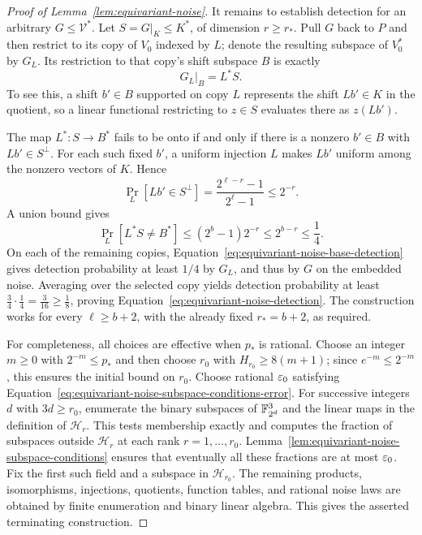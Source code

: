 \begin{proof}[Proof of Lemma~\ref{lem:equivariant-noise}]
It remains to establish detection for an arbitrary
$G\le\mathcal V^*$.  Let $S=G|_K\le K^*$, of dimension $r\ge r_*$.
Pull $G$ back to $P$ and then restrict to its copy of $V_0$ indexed by
$L$; denote the resulting subspace of $V_0^*$ by $G_L$.
Its restriction to that copy's shift subspace $B$ is exactly
\[
 G_L|_B=L^*S.
\]
To see this, a shift $b'\in B$ supported on copy $L$ represents the
shift $Lb'\in K$ in the quotient, so a linear functional restricting to
$z\in S$ evaluates there as $z(Lb')$.

The map $L^*:S\to B^*$ fails to be onto if and only if there is a
nonzero $b'\in B$ with $Lb'\in S^\perp$.  For each such fixed $b'$, a
uniform injection $L$ makes $Lb'$ uniform among the nonzero vectors of
$K$.  Hence
\[
 \Pr_L[Lb'\in S^\perp]
 =\frac{2^{\ell-r}-1}{2^\ell-1}
 \le2^{-r}.
\]
A union bound gives
\[
 \Pr_L[L^*S\ne B^*]
 \le(2^b-1)2^{-r}
 \le2^{b-r}\le\frac14.
\]
On each of the remaining copies,
Equation~\eqref{eq:equivariant-noise-base-detection} gives detection probability at
least $1/4$ by $G_L$, and thus by $G$ on the embedded noise.
Averaging over the selected copy yields detection probability at least
$\frac34\cdot\frac14=\frac{3}{16}\ge\frac18$, proving
Equation~\eqref{eq:equivariant-noise-detection}.
The construction works for every $\ell\ge b+2$, with the already fixed
$r_*=b+2$, as required.

For completeness, all choices are effective when $p_*$ is rational.
Choose an integer $m\ge0$ with $2^{-m}\le p_*$ and then choose $r_0$ with
$H_{r_0}\ge8(m+1)$; since $e^{-m}\le2^{-m}$, this ensures the initial
bound on $r_0$.  Choose rational $\varepsilon_0$ satisfying
Equation~\eqref{eq:equivariant-noise-subspace-conditions-error}.  For successive integers $d$ with
$3d\ge r_0$, enumerate the binary subspaces of $\mathbb F_{2^d}^3$ and the linear
maps in the definition of $\mathcal H_r$.  This tests membership exactly and
computes the fraction of subspaces outside $\mathcal H_r$ at each rank $r=1,\ldots,r_0$.
Lemma~\ref{lem:equivariant-noise-subspace-conditions} ensures that eventually all these fractions
are at most $\varepsilon_0$.  Fix the first such field and a subspace in $\mathcal H_{r_0}$.  The remaining products, isomorphisms, injections, quotients, function
tables, and rational noise laws are obtained by finite enumeration and
binary linear algebra.  This gives the asserted terminating construction.
\end{proof}
